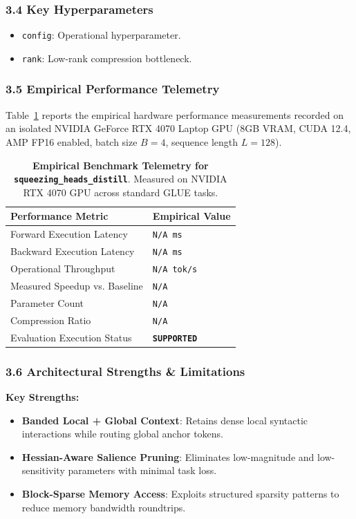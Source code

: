 \subsubsection*{3.4 Key Hyperparameters}
\begin{itemize}
    \item \texttt{config}: Operational hyperparameter.
    \item \texttt{rank}: Low-rank compression bottleneck.
\end{itemize}

\subsubsection*{3.5 Empirical Performance Telemetry}
Table~\ref{tab:telemetry_squeezing_heads_distill} reports the empirical hardware performance measurements recorded on an isolated NVIDIA GeForce RTX 4070 Laptop GPU (8GB VRAM, CUDA 12.4, AMP FP16 enabled, batch size $B=4$, sequence length $L=128$).

\begin{table}[h]
\centering
\small
\caption{\textbf{Empirical Benchmark Telemetry for \texttt{squeezing\_heads\_distill}}. Measured on NVIDIA RTX 4070 GPU across standard GLUE tasks.}
\label{tab:telemetry_squeezing_heads_distill}
\begin{tabularx}{\columnwidth}{lX}
\toprule
\textbf{Performance Metric} & \textbf{Empirical Value} \\
\midrule
Forward Execution Latency & \texttt{N/A ms} \\
Backward Execution Latency & \texttt{N/A ms} \\
Operational Throughput & \texttt{N/A tok/s} \\
Measured Speedup vs. Baseline & \texttt{N/A} \\
Parameter Count & \texttt{N/A} \\
Compression Ratio & \texttt{N/A} \\
Evaluation Execution Status & \textbf{\texttt{SUPPORTED}} \\
\bottomrule
\end{tabularx}
\end{table}

\subsubsection*{3.6 Architectural Strengths \& Limitations}
\textbf{Key Strengths:}
\begin{itemize}
    \item \textbf{Banded Local + Global Context}: Retains dense local syntactic interactions while routing global anchor tokens.
    \item \textbf{Hessian-Aware Salience Pruning}: Eliminates low-magnitude and low-sensitivity parameters with minimal task loss.
    \item \textbf{Block-Sparse Memory Access}: Exploits structured sparsity patterns to reduce memory bandwidth roundtrips.
\end{itemize}

